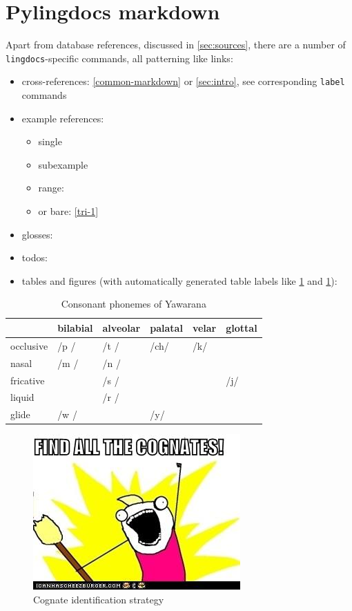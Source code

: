 \documentclass{article}
\begin{document}
\section{\texorpdfstring{Pylingdocs markdown
\label{pld-md}}{Pylingdocs markdown }}

Apart from database references, discussed in \cref{sec:sources}, there
are a number of \texttt{lingdocs}-specific commands, all patterning like
links:

\begin{itemize}
\tightlist
\item
  cross-references: \cref{common-markdown} or \cref{sec:intro}, see
  corresponding \texttt{label} commands
\item
  example references:

  \begin{itemize}
  \tightlist
  \item
    single 
  \item
    subexample 
  \item
    range: 
  \item
    or bare: \ref{tri-1}
  \end{itemize}
\item
  glosses: 
\item
  todos:
\item
  tables and figures (with automatically generated table labels like
  \cref{tab:consonants} and \cref{fig:cognates}):
\end{itemize}

\begin{table}
\caption{Consonant phonemes of Yawarana}
\label{tab:consonants}
\centering
\begin{tabular}{llllll}
\toprule
 & bilabial & alveolar & palatal & velar & glottal \\
\midrule
occlusive & /p / & /t / & /ch/ & /k/ &  \\
nasal & /m / & /n / &  &  &  \\
fricative &  & /s / &  &  & /j/ \\
liquid &  & /r / &  &  &  \\
glide & /w / &  & /y/ &  &  \\
\bottomrule
\end{tabular}

\end{table}

\begin{figure}
\centering
\includegraphics{figures/cognates.jpg}
\caption{Cognate identification strategy\label{fig:cognates}}
\end{figure}
\end{document}

